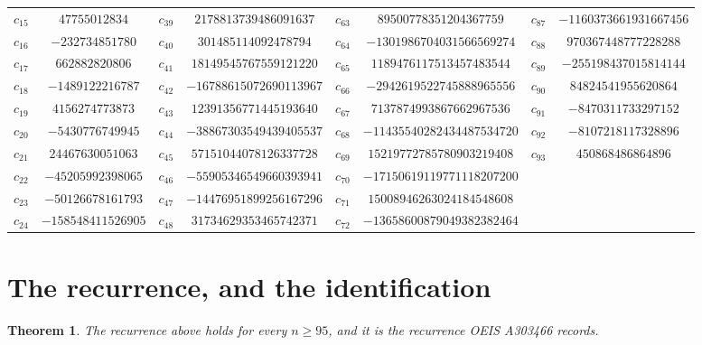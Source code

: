\documentclass[11pt,a4paper]{article}
\theoremstyle{plain}
\newtheorem{theorem}{Theorem}
\theoremstyle{definition}
\begin{document}
\begin{center}
\begin{tabular}{cccccccc}
$c_{15}$ & $47755012834$ & $c_{39}$ & $2178813739486091637$ & $c_{63}$ & $89500778351204367759$ & $c_{87}$ & $-1160373661931667456$ \\
$c_{16}$ & $-232734851780$ & $c_{40}$ & $301485114092478794$ & $c_{64}$ & $-1301986704031566569274$ & $c_{88}$ & $970367448777228288$ \\
$c_{17}$ & $662882820806$ & $c_{41}$ & $18149545767559121220$ & $c_{65}$ & $1189476117513457483544$ & $c_{89}$ & $-255198437015814144$ \\
$c_{18}$ & $-1489122216787$ & $c_{42}$ & $-16788615072690113967$ & $c_{66}$ & $-2942619522745888965556$ & $c_{90}$ & $84824541955620864$ \\
$c_{19}$ & $4156274773873$ & $c_{43}$ & $12391356771445193640$ & $c_{67}$ & $7137874993867662967536$ & $c_{91}$ & $-8470311733297152$ \\
$c_{20}$ & $-5430776749945$ & $c_{44}$ & $-38867303549439405537$ & $c_{68}$ & $-11435540282434487534720$ & $c_{92}$ & $-8107218117328896$ \\
$c_{21}$ & $24467630051063$ & $c_{45}$ & $57151044078126337728$ & $c_{69}$ & $15219772785780903219408$ & $c_{93}$ & $450868486864896$ \\
$c_{22}$ & $-45205992398065$ & $c_{46}$ & $-55905346549660393941$ & $c_{70}$ & $-17150619119771118207200$ &  &  \\
$c_{23}$ & $-50126678161793$ & $c_{47}$ & $-14476951899256167296$ & $c_{71}$ & $15008946263024184548608$ &  &  \\
$c_{24}$ & $-158548411526905$ & $c_{48}$ & $31734629353465742371$ & $c_{72}$ & $-13658600879049382382464$ &  &  \\
\end{tabular}
\end{center}

\section{The recurrence, and the identification}

\begin{theorem}
The recurrence above holds for every $n\ge95$, and it is the recurrence OEIS A303466 records.
\end{theorem}
\end{document}

